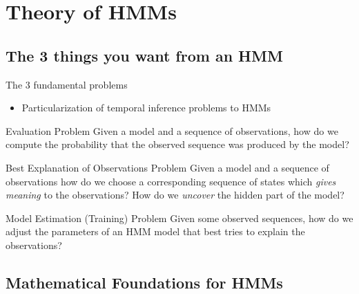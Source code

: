 \section{Theory of HMMs}
\label{sec:theory}

\subsection{The 3 things you want from an HMM}
\label{sec:problems}

\begin{frame}
  
  The 3 fundamental problems \cite{rabiner1989tutorial}

  \begin{itemize}
  	\item Particularization of temporal inference problems to HMMs
  \end{itemize}

  \begin{block}{Evaluation Problem}
    Given a model and a sequence of observations, how do we compute the probability that the \alert{observed 
    sequence} was produced by the model?
  \end{block}
  \pause
  \begin{block}{Best Explanation of Observations Problem}
    Given a model and a sequence of observations how do we choose a corresponding sequence of \alert{states} which 
    \emph{gives meaning} to the observations? How do we \emph{uncover} the hidden part of the model?
  \end{block}
  \pause
  \begin{block}{Model Estimation (Training) Problem}
    Given some observed sequences, how do we adjust the \alert{parameters} of an HMM model that best tries to explain 
    the observations? 
    
  \end{block}

\end{frame}


\subsection{Mathematical Foundations for HMMs}
\label{sec:math}


